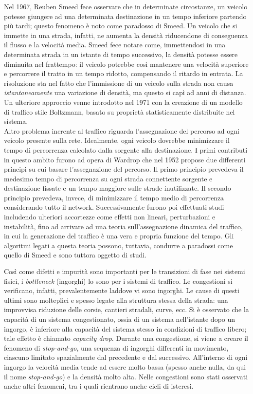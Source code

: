 Nel 1967, Reuben Smeed fece osservare che in determinate circostanze, un veicolo potesse giungere ad una determinata destinazione in un tempo inferiore partendo pi\`u tardi; questo fenomeno \`e noto come paradosso di Smeed.
Un veicolo che si immette in una strada, infatti, ne aumenta la densit\`a riducendone di conseguenza il flusso e la velocit\`a media.
Smeed fece notare come, immettendosi in una determinata strada in un istante di tempo successivo, la densit\`a potesse essere diminuita nel frattempo: il veicolo potrebbe cos\`i mantenere una velocit\`a superiore e percorrere il tratto in un tempo ridotto, compensando il ritardo in entrata.
La risoluzione sta nel fatto che l'immissione di un veicolo sulla strada non causa \emph{istantaneamente} una variazione di densit\`a, ma questo si cap\`i ad anni di distanza.
Un ulteriore approccio venne introdotto nel 1971 con la creazione di un modello di traffico stile Boltzmann, basato su propriet\`a statisticamente distribuite nel sistema.\\
Altro problema inerente al traffico riguarda l'assegnazione del percorso ad ogni veicolo presente sulla rete.
Idealmente, ogni veicolo dovrebbe minimizzare il tempo di percorrenza calcolato dalla sorgente alla destinazione.
I primi contributi in questo ambito furono ad opera di Wardrop che nel 1952 propose due differenti principi su cui basare l'assegnazione del percorso.
Il primo principio prevedeva il medesimo tempo di percorrenza su ogni strada connettente sorgente e destinazione fissate e un tempo maggiore sulle strade inutilizzate.
Il secondo principio prevedeva, invece, di minimizzare il tempo medio di percorrenza considerando tutto il network.
Successivamente furono poi effettuati studi includendo ulteriori accortezze come effetti non lineari, perturbazioni e instabilit\`a, fino ad arrivare ad una teoria sull'assegnazione dinamica del traffico, in cui la generazione del traffico \`e una vera e propria funzione del tempo.
Gli algoritmi legati a questa teoria possono, tuttavia, condurre a paradossi come quello di Smeed e sono tuttora oggetto di studi.

Cos\`i come difetti e impurit\`a sono importanti per le transizioni di fase nei sistemi fisici, i \emph{bottleneck} (ingorghi) lo sono per i sistemi di traffico.
Le congestioni si verificano, infatti, prevalentemente laddove vi sono ingorghi.
Le cause di questi ultimi sono molteplici e spesso legate alla struttura stessa della strada: una improvvisa riduzione delle corsie, cantieri stradali, curve, ecc.
Si \`e osservato che la capacit\`a di un sistema congestionato, ossia di un sistema nell'istante dopo un ingorgo, \`e inferiore alla capacit\`a del sistema stesso in condizioni di traffico libero; tale effetto \`e chiamato \emph{capacity drop}.
Durante una congestione, si viene a creare il fenomeno di \emph{stop-and-go}, una sequenza di ingorghi differenti in movimento, ciascuno limitato spazialmente dal precedente e dal successivo.
All'interno di ogni ingorgo la velocit\`a media tende ad essere molto bassa (spesso anche nulla, da qui il nome \emph{stop-and-go}) e la densit\`a molto alta.
Nelle congestioni sono stati osservati anche altri fenomeni, tra i quali rientrano anche cicli di isteresi.

